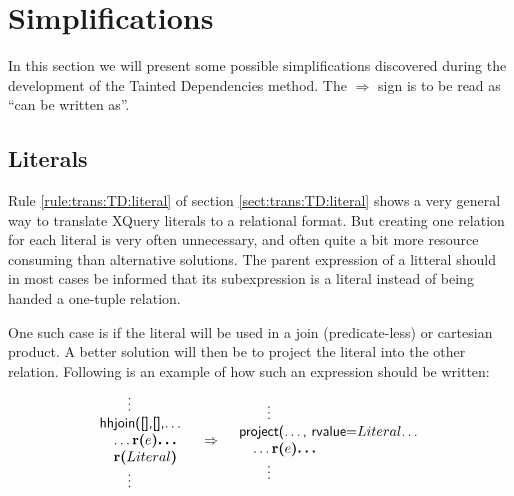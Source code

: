 \section{Simplifications}
\label{sect:trans:TD:simplifications}

In this section we will present some possible simplifications discovered during
the development of the Tainted Dependencies method. The $\Rightarrow$ sign is
to be read as ``can be written as''.

\subsection{Literals}
\label{sect:trans:TD:simpl:lit}      

Rule \ref{rule:trans:TD:literal} of section \ref{sect:trans:TD:literal} shows a very general way to translate
XQuery literals to a relational format. But creating one relation for each literal is very often unnecessary, and
often quite a bit more resource consuming than alternative solutions. The parent expression of a litteral should
in most cases be informed that its subexpression is a literal instead of being handed a one-tuple relation.

One such case is if the literal will be used in a join (predicate-less) or cartesian product. A better solution
will then be to project the literal into the other relation. Following is an
example of how such an expression should be written:
\begin{equation}
\begin{array}{lcr}
\begin{array}{l}
\mbox{\quad\quad\textsf{\vdots}} \\
\mbox{\textsf{hhjoin([],[],\ldots}} \\ \quad
\mbox{\textsf{\ldots}\textbf{r(}}e\mbox{\textbf{)\ldots}} \\ \quad
\mbox{\textbf{r(}}Literal\mbox{\textbf{)}} \\
\mbox{\quad\quad\textsf{\vdots}}
\end{array}
&
\Rightarrow
&
\begin{array}{l}
\mbox{\quad\quad\textsf{\vdots}} \\
\mbox{\textsf{project(\ldots, rvalue=}}Literal\mbox{\textsf{\ldots}} \\ \quad
\mbox{\textsf{\ldots}\textbf{r(}}e\mbox{\textbf{)\ldots}} \\
\mbox{\quad\quad\textsf{\vdots}}
\end{array}
\end{array}
\label{simpl:trans:TD:joinLit}
\end{equation}

